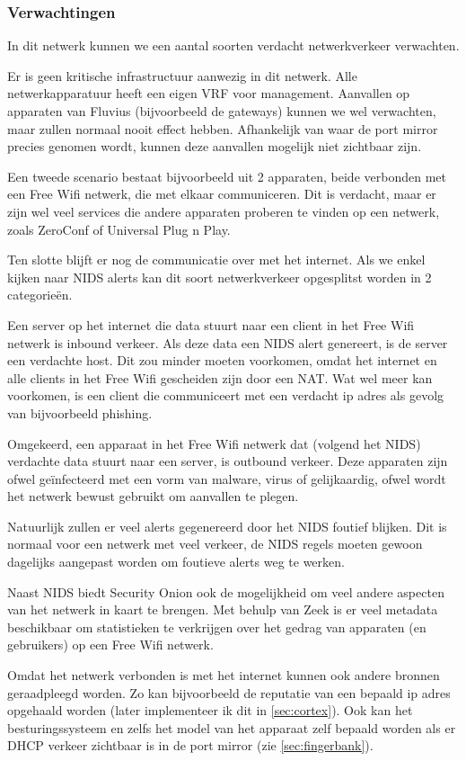\documentclass[a4paper, 12pt]{report}
\begin{document}
\subsubsection{Verwachtingen}
In dit netwerk kunnen we een aantal soorten verdacht netwerkverkeer verwachten.

Er is geen kritische infrastructuur aanwezig in dit netwerk.
Alle netwerkapparatuur heeft een eigen VRF voor management.
Aanvallen op apparaten van Fluvius (bijvoorbeeld de gateways) kunnen we wel verwachten, maar zullen normaal nooit effect hebben.
Afhankelijk van waar de port mirror precies genomen wordt, kunnen deze aanvallen mogelijk niet zichtbaar zijn.

Een tweede scenario bestaat bijvoorbeeld uit 2 apparaten, beide verbonden met een Free Wifi netwerk, die met elkaar communiceren.
Dit is verdacht, maar er zijn wel veel services die andere apparaten proberen te vinden op een netwerk, zoals ZeroConf of Universal Plug n Play.

Ten slotte blijft er nog de communicatie over met het internet.
Als we enkel kijken naar NIDS alerts kan dit soort netwerkverkeer opgesplitst worden in 2 categorieën.

Een server op het internet die data stuurt naar een client in het Free Wifi netwerk is inbound verkeer.
Als deze data een NIDS alert genereert, is de server een verdachte host.
Dit zou minder moeten voorkomen, omdat het internet en alle clients in het Free Wifi gescheiden zijn door een NAT.
Wat wel meer kan voorkomen, is een client die communiceert met een verdacht ip adres als gevolg van bijvoorbeeld phishing.

Omgekeerd, een apparaat in het Free Wifi netwerk dat (volgend het NIDS) verdachte data stuurt naar een server, is outbound verkeer.
Deze apparaten zijn ofwel geïnfecteerd met een vorm van malware, virus of gelijkaardig, ofwel wordt het netwerk bewust gebruikt om aanvallen te plegen.

Natuurlijk zullen er veel alerts gegenereerd door het NIDS foutief blijken.
Dit is normaal voor een netwerk met veel verkeer, de NIDS regels moeten gewoon dagelijks aangepast worden om foutieve alerts weg te werken.

Naast NIDS biedt Security Onion ook de mogelijkheid om veel andere aspecten van het netwerk in kaart te brengen.
Met behulp van Zeek is er veel metadata beschikbaar om statistieken te verkrijgen over het gedrag van apparaten (en gebruikers) op een Free Wifi netwerk.

Omdat het netwerk verbonden is met het internet kunnen ook andere bronnen geraadpleegd worden.
Zo kan bijvoorbeeld de reputatie van een bepaald ip adres opgehaald worden (later implementeer ik dit in \ref{sec:cortex}).
Ook kan het besturingssysteem en zelfs het model van het apparaat zelf bepaald worden als er DHCP verkeer zichtbaar is in de port mirror (zie \ref{sec:fingerbank}).
\end{document}
